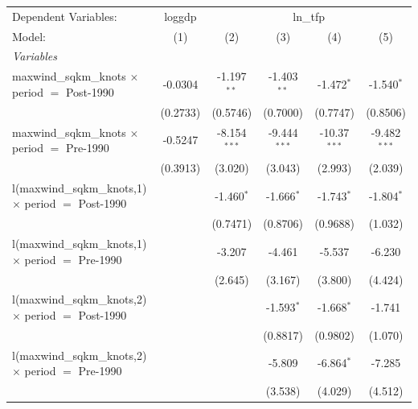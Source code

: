 
\begingroup
\centering
\begin{tabular}{lccccc}
   \tabularnewline \midrule \midrule
   Dependent Variables: & loggdp & \multicolumn{4}{c}{ln\_tfp}\\
   Model:                                                     & (1)      & (2)            & (3)            & (4)            & (5)\\  
   \midrule
   \emph{Variables}\\
   maxwind\_sqkm\_knots $\times$ period $=$ Post-1990         & -0.0304  & -1.197$^{**}$  & -1.403$^{**}$  & -1.472$^{*}$   & -1.540$^{*}$\\   
                                                              & (0.2733) & (0.5746)       & (0.7000)       & (0.7747)       & (0.8506)\\   
   maxwind\_sqkm\_knots $\times$ period $=$ Pre-1990          & -0.5247  & -8.154$^{***}$ & -9.444$^{***}$ & -10.37$^{***}$ & -9.482$^{***}$\\   
                                                              & (0.3913) & (3.020)        & (3.043)        & (2.993)        & (2.039)\\   
   l(maxwind\_sqkm\_knots,1) $\times$ period $=$ Post-1990    &          & -1.460$^{*}$   & -1.666$^{*}$   & -1.743$^{*}$   & -1.804$^{*}$\\   
                                                              &          & (0.7471)       & (0.8706)       & (0.9688)       & (1.032)\\   
   l(maxwind\_sqkm\_knots,1) $\times$ period $=$ Pre-1990     &          & -3.207         & -4.461         & -5.537         & -6.230\\   
                                                              &          & (2.645)        & (3.167)        & (3.800)        & (4.424)\\   
   l(maxwind\_sqkm\_knots,2) $\times$ period $=$ Post-1990    &          &                & -1.593$^{*}$   & -1.668$^{*}$   & -1.741\\   
                                                              &          &                & (0.8817)       & (0.9802)       & (1.070)\\   
   l(maxwind\_sqkm\_knots,2) $\times$ period $=$ Pre-1990     &          &                & -5.809         & -6.864$^{*}$   & -7.285\\   
                                                              &          &                & (3.538)        & (4.029)        & (4.512)\\   

\end{tabular}
